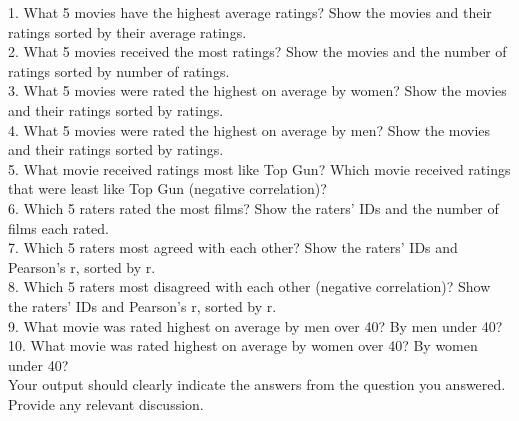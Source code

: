 \documentclass[letterpaper,11pt]{article}
\begin{document}
1.  What 5 movies have the highest average ratings? Show the movies and their ratings sorted by their average ratings.\\

2.  What 5 movies received the most ratings? Show the movies and the number of ratings sorted by number of ratings.\\

3.  What 5 movies were rated the highest on average by women? Show the movies and their ratings sorted by ratings.\\

4.  What 5 movies were rated the highest on average by men? Show the movies and their ratings sorted by ratings.\\

5.  What movie received ratings most like Top Gun? Which movie received ratings that were least like Top Gun (negative correlation)?\\

6.  Which 5 raters rated the most films? Show the raters' IDs and the number of films each rated.\\

7.  Which 5 raters most agreed with each other? Show the raters' IDs and Pearson's r, sorted by r.\\

8.  Which 5 raters most disagreed with each other (negative correlation)? Show the raters' IDs and Pearson's r, sorted by r.\\

9.  What movie was rated highest on average by men over 40? By men under 40?\\

10. What movie was rated highest on average by women over 40? By women under 40?\\

Your output should clearly indicate the answers from the question you answered.  Provide any relevant discussion.\\
\newpage
\end{document}

